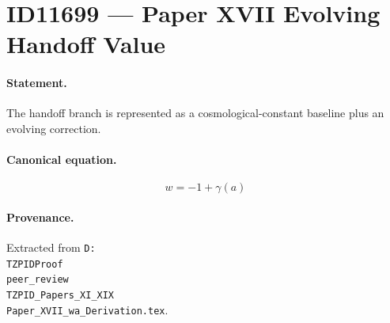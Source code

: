 \section*{ID11699 --- Paper XVII Evolving Handoff Value}

\paragraph{Statement.}
The handoff branch is represented as a cosmological-constant baseline plus an evolving correction.

\paragraph{Canonical equation.}
\[
w=-1+\gamma(a)
\]

\paragraph{Provenance.}
Extracted from \texttt{D:\\TZPIDProof\\peer\_review\\TZPID\_Papers\_XI\_XIX\\Paper\_XVII\_wa\_Derivation.tex}.
